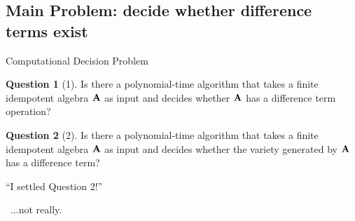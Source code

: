 \documentclass[notes=hide,12pt,xcolor=dvipsnames%
   ]{beamer}
\theoremstyle{definition}
\newtheorem{question}{Question}
\begin{document}
\subsection{Main Problem: decide whether difference terms exist}

\begin{frame}[label=computational]{Computational Decision Problem}

  \begin{question}[1]
    \label{prob:2}
    Is there a polynomial-time algorithm that takes a finite
    idempotent algebra $\mathbf{A}$ as input and decides whether 
    $\mathbf{A}$ has a difference term operation?
  \end{question}

  \pause
  \begin{question}[2]
  \label{prob:1}
  Is there a polynomial-time algorithm that takes a finite
  idempotent algebra $\mathbf{A}$ as input and decides whether the variety generated by
  $\mathbf{A}$ has a difference term?
  \end{question}

\end{frame}

\begin{frame}[label=premature]{}

  \begin{center}
    ``I settled Question 2!''


    \pause
    ~\phantom{XXXXXXXXXXX}...not really.
  \end{center}
\end{frame}
\begin{frame}[label=premature]{}

  \begin{center}
    \pause
  \end{center}
\end{frame}



\end{document}
